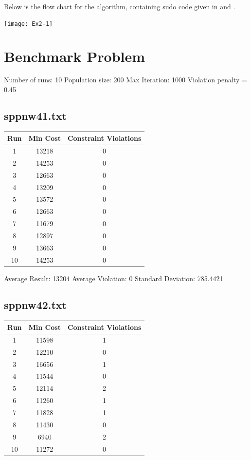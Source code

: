 \documentclass{article}
\begin{document}
Below is the flow chart for the algorithm, containing sudo code given in \cite{1&3} and \cite{2}.
\smallbreak

\texttt{[image: Ex2-1]}

\section{Benchmark Problem}

Number of runs: 10
\smallbreak
Population size: 200
\smallbreak
Max Iteration: 1000
\smallbreak
Violation penalty = 0.45

\subsection{sppnw41.txt}

\begin{center}
\begin{tabular}{ |c|c|c| } 
 \hline
Run & Min Cost & Constraint Violations \\ 
 \hline
 1 & 13218 & 0 \\ 
 \hline
 2 & 14253 & 0 \\ 
 \hline
 3 & 12663 & 0 \\ 
 \hline
 4 & 13209 & 0 \\ 
 \hline
 5 & 13572 & 0 \\ 
 \hline
 6 & 12663 & 0 \\ 
 \hline
 7 & 11679 & 0 \\  
 \hline
 8 & 12897 & 0 \\ 
 \hline
 9 & 13663 & 0 \\ 
 \hline
 10 & 14253 & 0 \\ 
 \hline
\end{tabular}
\end{center}

Average Result: 13204
\smallbreak
Average Violation: 0
\smallbreak
Standard Deviation: 785.4421

\subsection{sppnw42.txt}

\begin{center}
\begin{tabular}{ |c|c|c| } 
 \hline
Run & Min Cost & Constraint Violations \\ 
 \hline
 1 & 11598 & 1 \\ 
 \hline
 2 & 12210 & 0 \\ 
 \hline
 3 & 16656 & 1 \\ 
 \hline
 4 & 11544 & 0 \\ 
 \hline
 5 & 12114 & 2\\ 
 \hline
 6 & 11260 & 1 \\ 
 \hline
 7 & 11828 & 1 \\  
 \hline
 8 & 11430 & 0 \\ 
 \hline
 9 & 6940 & 2 \\ 
 \hline
 10 & 11272 & 0 \\ 
 \hline
\end{tabular}
\end{center}
\end{document}
